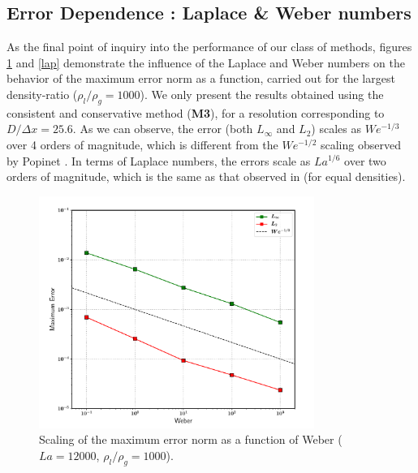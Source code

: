 \subsection*{Error Dependence : Laplace \& Weber numbers}

As the final point of inquiry into the performance of our class of methods, figures \ref{web} and \ref{lap} demonstrate the influence of the Laplace and Weber numbers on the behavior of the maximum error norm as a function, carried out for the largest density-ratio ($\rho_l/\rho_g = 1000$). We only present the results obtained using the consistent and conservative method (\textbf{M3}), for a resolution corresponding to $D / \Delta x = 25.6$. As we can observe, the error (both $L_\infty$ and $L_2$) scales as $We^{-1/3}$ over 4 orders of magnitude, which is different from the $We^{-1/2}$ scaling observed by Popinet \cite{popinet2009accurate} . In terms of Laplace numbers, the errors scale as $La^{1/6}$ over two orders of magnitude, which is the same as that observed in \cite{popinet2009accurate} (for equal densities).

\begin{figure}
    \centering
    \includegraphics[width = 0.8\textwidth]{plots/droplet_advect/webers.pdf}
\caption{ Scaling of the maximum error norm as a function of Weber ($La = 12000$, $\rho_l / \rho_g = 1000$). }
    \label{web}
\end{figure}

